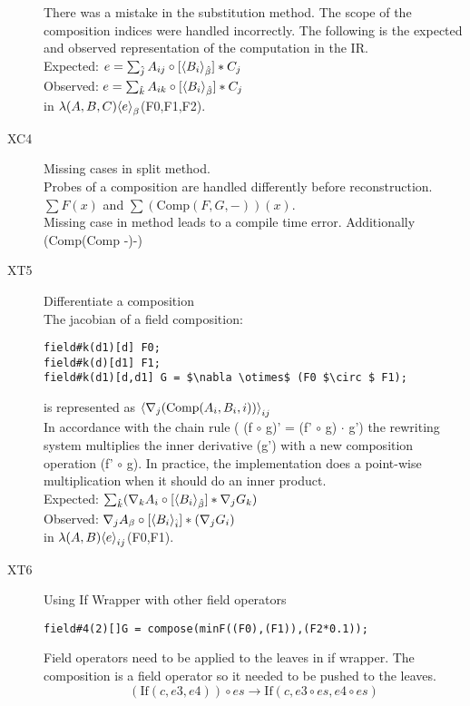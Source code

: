 \begin{description}
There was a mistake in the substitution method.
The scope of the composition indices were handled incorrectly.
The following is the expected and observed representation of the computation in the \name{} IR.\\
Expected: $e=\sum_{\hat{j}} {A_{ij}}\circ [{\left\langle{B_i}\right\rangle}_{\hat{\beta}}] *C_j $\\
Observed: $e=\sum_{\hat{k}} {A_{ik}}\circ [{\left\langle{B_i}\right\rangle}_{\hat{\beta}}] *C_j$\\
in $\lambda(A,B,C){\left\langle{e}\right\rangle}_{\beta}$(F0,F1,F2). 
\item[XC4] Missing cases in split method.\\
Probes of a composition are handled differently before reconstruction.\\
$\sum F(x)$ and $\sum (\text{Comp} (F,G,-))(x)$.\\
Missing case in method leads to a compile time error.
Additionally (Comp(Comp -)-)
\item[XT5]  Differentiate a composition\\
The jacobian of a field composition:
\begin{lstlisting}
field#k(d1)[d] F0;
field#k(d)[d1] F1;
field#k(d1)[d,d1] G = $\nabla \otimes$ (F0 $\circ $ F1);
\end{lstlisting}
is represented as ${\left\langle{\nabla_j (\text{Comp}(A_i,B_i,i))}\right\rangle}_{ij}$\\
In accordance with the chain rule ( (f $\circ $ g)' = (f'  $\circ $ g) $\cdot$ g') the rewriting system multiplies the inner derivative (g') with a new composition operation (f'  $\circ $ g).
In practice, the implementation does a point-wise multiplication when it should do an inner product.\\
 Expected: $\sum_{\hat{k}} ({\nabla_k A_i}\circ [{\left\langle{B_i}\right\rangle}_{\hat{\beta}}] * \nabla_j G_k) $\\
Observed: ${\nabla_j  A_{\beta}}\circ [{\left\langle{B_i}\right\rangle}_{\hat{ i}}] * (\nabla_j G_i)$\\
in $\lambda(A,B){\left\langle{e}\right\rangle}_{ij}$(F0,F1). 
\item[XT6]
Using If Wrapper with other field operators
\begin{lstlisting}[mathescape=true]
field#4(2)[]G = compose(minF((F0),(F1)),(F2*0.1));
\end{lstlisting}
Field operators need to be applied to the leaves in if wrapper. 
The composition is a field operator so it needed to be pushed to the leaves.
$$(\text{If}(c, e3,e4)) \circ es  
\rightarrow
\text{If}(c, e3  \circ es ,e4 \circ es) $$

\end{description}
